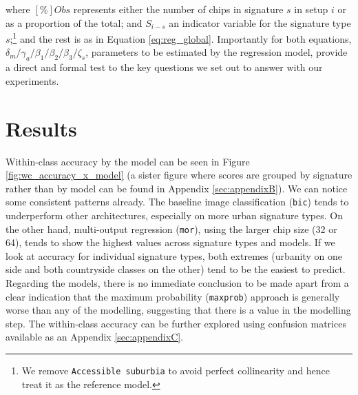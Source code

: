 \documentclass[]{interact}
\theoremstyle{plain}%
\theoremstyle{definition}
\theoremstyle{remark}
\begin{document}
where $\left[\%\right]Obs$ represents either the number of chips in
signature $s$ in setup $i$ or as a proportion of the total; and $S_{i-s}$ an
indicator variable for the signature type $s$;\footnote{We remove
\texttt{Accessible suburbia} to avoid perfect collinearity and hence treat it
as the reference model.} and the rest is as in Equation \ref{eq:reg_global}.
%
Importantly for both equations,
$\delta_m/\gamma_a/\beta_1/\beta_2/\beta_3/\zeta_s$, parameters to be
estimated by the regression model, provide a direct and formal test to the key
questions we set out to answer with our experiments.

\section{Results} %
\label{sec:results}



Within-class accuracy by the model can be seen in Figure \ref{fig:wc_accuracy_x_model} (a
sister figure where scores are grouped by signature rather than by model can be found in
Appendix \ref{sec:appendixB}). We can notice some consistent patterns already. The
baseline image classification (\texttt{bic}) tends to underperform other architectures,
especially on more urban signature types. On the other hand, multi-output regression (\texttt{mor}),
using the larger chip size (32 or 64), tends to show the highest values across signature
types and models. If we look at accuracy for individual signature types, both extremes
(urbanity on one side and both countryside classes on the other)
tend to be the easiest to predict. Regarding the models, there is no immediate conclusion to be
made apart from a clear indication that the maximum probability (\texttt{maxprob}) approach is generally
worse than any of the modelling, suggesting that there is a value in the modelling step.
The within-class accuracy can be further explored using confusion matrices available as an
Appendix \ref{sec:appendixC}.
\end{document}

